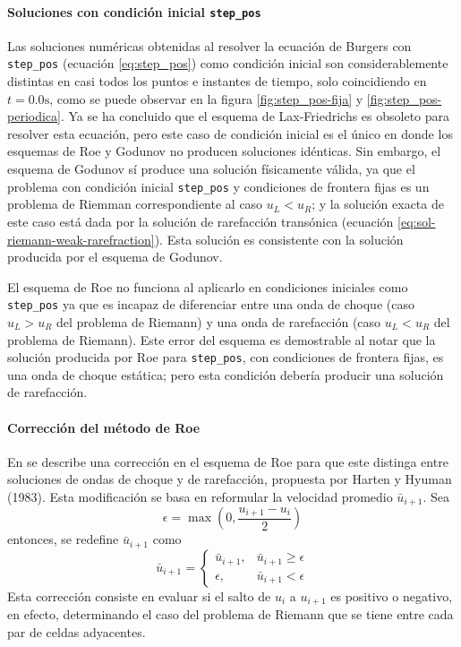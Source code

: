 \documentclass[12pt]{article}
\begin{document}
	\paragraph*{Soluciones con condición inicial \texttt{step\_pos}}
	Las soluciones numéricas obtenidas al resolver la ecuación de Burgers con \texttt{step\_pos} (ecuación \ref{eq:step_pos}) como condición inicial son considerablemente distintas en casi todos los puntos e instantes de tiempo, solo coincidiendo en $t=0.0\unit{\second}$, como se puede observar en la figura \ref{fig:step_pos-fija} y \ref{fig:step_pos-periodica}. Ya se ha concluido que el esquema de Lax-Friedrichs es obsoleto para resolver esta ecuación, pero este caso de condición inicial es el único en donde los esquemas de Roe y Godunov no producen soluciones idénticas. Sin embargo, el esquema de Godunov sí produce una solución físicamente válida, ya que el problema con condición inicial \texttt{step\_pos} y condiciones de frontera fijas es un problema de Riemman correspondiente al caso $u_L < u_R$; y la solución exacta de este caso está dada por la solución de rarefacción transónica (ecuación \ref{eq:sol-riemann-weak-rarefraction}). Esta solución es consistente con la solución producida por el esquema de Godunov.
	
	
	El esquema de Roe no funciona al aplicarlo en condiciones iniciales como \texttt{step\_pos} ya que es incapaz de diferenciar entre una onda de choque (caso $u_L > u_R$ del problema de Riemann) y una onda de rarefacción (caso $u_L < u_R$ del problema de Riemann). Este error del esquema es demostrable al notar que la solución producida por Roe para \texttt{step\_pos}, con condiciones de frontera fijas, es una onda de choque estática; pero esta condición debería producir una solución de rarefacción. 
	
	\paragraph*{Corrección del método de Roe}
	En \cite{pletcher1997computational} se describe una corrección en el esquema de Roe para que este distinga entre soluciones de ondas de choque y de rarefacción, propuesta por Harten y Hyuman (1983). Esta modificación se basa en reformular la velocidad promedio $\bar{u}_{i+1}$. Sea 
	\begin{equation}
		\epsilon = \max\left(0, \frac{u_{i+1} - u_i}{2}\right)
	\end{equation}
	entonces, se redefine $\bar{u}_{i+1}$ como
	\begin{equation}
		\bar{u}_{i+1} = 
		\begin{cases}
			\bar{u}_{i+1}, & \bar{u}_{i+1} \geq \epsilon \\
			\epsilon, & \bar{u}_{i+1} < \epsilon
		\end{cases}
	\end{equation}
	Esta corrección consiste en evaluar si el salto de $u_i$ a $u_{i+1}$ es positivo o negativo, en efecto, determinando el caso del problema de Riemann que se tiene entre cada par de celdas adyacentes.
	
\end{document}
